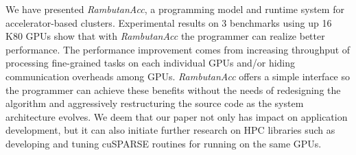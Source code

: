 We have presented {\em RambutanAcc}, a programming model and runtime system for accelerator-based clusters.
Experimental results on 3 benchmarks using up 16 K80 GPUs show that with {\em RambutanAcc} the programmer can realize better performance.
The performance improvement comes from increasing throughput of processing fine-grained tasks on each individual GPUs and/or hiding communication overheads among GPUs.
{\em RambutanAcc} offers a simple interface so the programmer can achieve these benefits without the needs of redesigning the algorithm and aggressively restructuring the source code as the system architecture evolves.
We deem that our paper not only has impact on application development, but it can also initiate further research on HPC libraries such as developing and tuning cuSPARSE routines for running on the same GPUs. 
